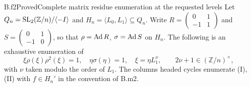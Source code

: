 \begin{claim}{B.f2}{Proved}{Complete matrix residue enumeration at the requested levels}
Let $Q_n=\operatorname{SL}_2(\mathbb Z/n)/\langle-I\rangle$ and
$H_n=\langle L_0,L_1\rangle\subseteq Q_n$. Write
$R=\left(\begin{smallmatrix}0&1\\-1&1\end{smallmatrix}\right)$ and
$S=\left(\begin{smallmatrix}0&1\\-1&0\end{smallmatrix}\right)$, so that
$\rho=\operatorname{Ad} R$, $\sigma=\operatorname{Ad} S$ on $H_n$. The following is an exhaustive
enumeration of
\[
 \xi\rho(\xi)\rho^2(\xi)=1,\quad
 \eta\sigma(\eta)=1,\quad \xi=\eta L_1^\nu,
 \qquad 2\nu+1\in(\mathbb Z/n)^\times,
 \tag{B.f2.1}
\]
with $\nu$ taken modulo the order of $L_1$. The columns headed cycles
enumerate (I),(II) with $f\in H_n'$ in the convention of B.m2.
\end{claim}

